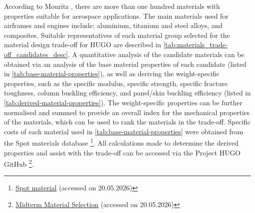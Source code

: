 According to Mouritz \cite{Mouritz2012}, there are more than one hundred materials with properties suitable for aerospace applications. The main materials used for airframes and engines include: aluminium, titanium and steel alloys, and composites. Suitable representatives of each material group selected for the material design trade-off for HUGO are described in \autoref{tab:materials_trade-off_candidates_desc}.
A quantitative analysis of the candidate materials can be obtained via an analysis of the base material properties of each candidate (listed in \autoref{tab:base-material-properties}), as well as deriving the weight-specific properties, such as the specific modulus, specific strength, specific fracture toughness, column buckling efficiency, and panel/skin buckling efficiency (listed in \autoref{tab:derived-material-properties}). The weight-specific properties can be further normalised and summed to provide an overall index for the mechanical properties of the materials, which can be used to rank the materials in the trade-off. Specific costs of each material used in \autoref{tab:base-material-properties} were obtained from the Spot materials database \footnote{\href{https://spotmaterial.com/}{Spot material} (accessed on 20.05.2026)}. All calculations made to determine the derived properties and assist with the trade-off can be accessed via the Project HUGO GitHub \footnote{\label{url:midterm_material_selection}\href{https://docs.google.com/spreadsheets/d/1GpVjdeAKDGPKHCRgVgf5LDyppZcSMRnKjkgZY_FNGBo/edit?gid=916630606#gid=916630606}{Midterm Material Selection} (accessed on 20.05.2026)}.

